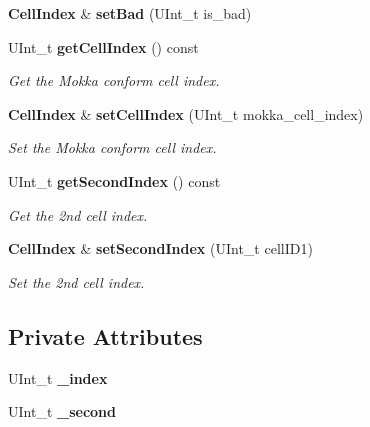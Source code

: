 \begin{DoxyCompactItemize}
\item 
{\bf CellIndex} \& {\bfseries setBad} (UInt\_\-t is\_\-bad)\label{classCALICE_1_1CellIndex_aaedafad4a164da776eb9563f6cfecb02}

\item 
UInt\_\-t {\bf getCellIndex} () const \label{classCALICE_1_1CellIndex_a8989a0bfe43f87f5ba5d5f665cc8fd60}

\begin{DoxyCompactList}\small\item\em Get the Mokka conform cell index. \item\end{DoxyCompactList}\item 
{\bf CellIndex} \& {\bf setCellIndex} (UInt\_\-t mokka\_\-cell\_\-index)\label{classCALICE_1_1CellIndex_a06927c6c271b586b2d4f2349ad0a0058}

\begin{DoxyCompactList}\small\item\em Set the Mokka conform cell index. \item\end{DoxyCompactList}\item 
UInt\_\-t {\bf getSecondIndex} () const \label{classCALICE_1_1CellIndex_a62457057612992847f0d1a6791e5eed0}

\begin{DoxyCompactList}\small\item\em Get the 2nd cell index. \item\end{DoxyCompactList}\item 
{\bf CellIndex} \& {\bf setSecondIndex} (UInt\_\-t cellID1)\label{classCALICE_1_1CellIndex_acee8e762e051e2e12e0bfab43be8c441}

\begin{DoxyCompactList}\small\item\em Set the 2nd cell index. \item\end{DoxyCompactList}\end{DoxyCompactItemize}
\subsection*{Private Attributes}
\begin{DoxyCompactItemize}
\item 
UInt\_\-t {\bfseries \_\-index}\label{classCALICE_1_1CellIndex_a0422c3652b611890e2c610eef01fc43e}

\item 
UInt\_\-t {\bfseries \_\-second}\label{classCALICE_1_1CellIndex_adcca7440632d6d8b81aa514a89035b6f}

\end{DoxyCompactItemize}



